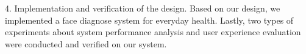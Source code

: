 \documentclass[oneside,type=master]{fduthesis}
\begin{document}
\begin{abstract*}
4. Implementation and verification of the design.
Based on our design, we implemented a face diagnose system for everyday health. Lastly, two types of experiments about system performance analysis and user experience evaluation were conducted and verified on our system.


\end{abstract*}

% 
\mainmatter






% 






%

\backmatter

\small
% 

%  



\normalsize
% 
\end{document}
